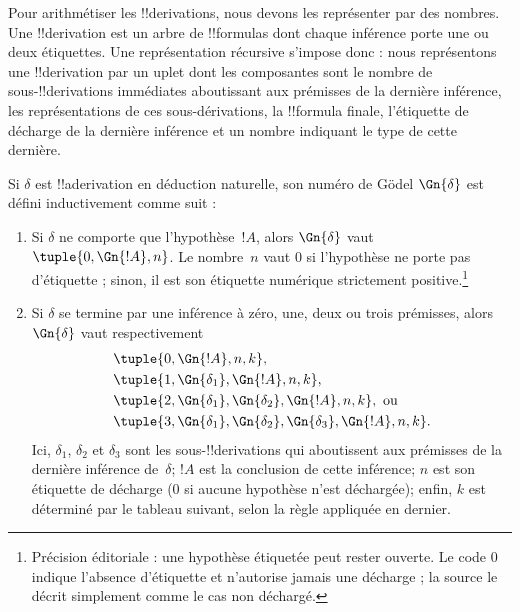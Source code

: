 \documentclass[../../../include/open-logic-section]{subfiles}
\begin{document}

\begin{explain}
Pour arithmétiser les !!{derivation}s, nous devons les représenter
par des nombres. Une !!{derivation} est un arbre de !!{formula}s
dont chaque inférence porte une ou deux étiquettes. Une
représentation récursive s'impose donc : nous représentons une
!!{derivation} par un uplet dont les composantes sont le nombre de
sous-!!{derivation}s immédiates aboutissant aux prémisses de la
dernière inférence, les représentations de ces sous-dérivations,
la !!{formula} finale, l'étiquette de décharge de la dernière
inférence et un nombre indiquant le type de cette dernière.
\end{explain}

\begin{defn}
  Si $\delta$ est !!a{derivation} en déduction naturelle, son numéro
  de G\"odel $\Gn{\delta}$ est défini inductivement comme suit :
  \begin{enumerate}
  \item Si $\delta$ ne comporte que l'hypothèse~$!A$, alors
    $\Gn{\delta}$ vaut $\tuple{0, \Gn{!A}, n}$. Le nombre~$n$ vaut
    $0$ si l'hypothèse ne porte pas d'étiquette ; sinon, il est son
    étiquette numérique strictement positive.\footnote{Précision éditoriale : une hypothèse étiquetée peut rester ouverte. Le code $0$ indique l'absence d'étiquette et n'autorise jamais une décharge ; la source le décrit simplement comme le cas non déchargé.}
  \item Si $\delta$ se termine par une inférence à zéro, une, deux
    ou trois prémisses, alors $\Gn{\delta}$ vaut respectivement
    \begin{align*}
      & \tuple{0, \Gn{!A}, n, k}, \\
      & \tuple{1, \Gn{\delta_1}, \Gn{!A}, n, k}, \\
      & \tuple{2, \Gn{\delta_1}, \Gn{\delta_2}, \Gn{!A}, n, k}, \text{ ou}\\
      & \tuple{3, \Gn{\delta_1}, \Gn{\delta_2}, \Gn{\delta_3}, \Gn{!A}, n,
        k}.
    \end{align*}
    Ici, $\delta_1$, $\delta_2$ et $\delta_3$ sont les
    sous-!!{derivation}s qui aboutissent aux prémisses de la dernière
    inférence de~$\delta$; $!A$ est la conclusion de cette inférence;
    $n$ est son étiquette de décharge ($0$ si aucune hypothèse n'est
    déchargée); enfin, $k$ est déterminé par le tableau suivant,
    selon la règle appliquée en dernier.


\end{enumerate}
\end{defn}
\end{document}
